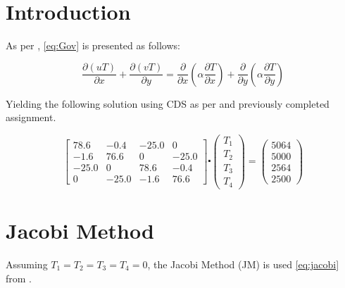 
\chapter{Introduction}
\label{chap:intro}

As per \cite{assign}, \ref{eq:Gov} is presented as follows:

\begin{equation}
	\label{eq:Gov}	
	\frac{\partial(uT)}{\partial x} + \frac{\partial(vT)}{\partial y}= \frac{\partial}{\partial x} \left( \alpha \frac{\partial T}{\partial x} \right) + \frac{\partial}{\partial y} \left( \alpha \frac{\partial T}{\partial y} \right)
\end{equation}

Yielding the following solution using CDS as per \cite{assign} and previously completed assignment.

\begin{equation*}
	\begin{bmatrix}
		78.6	&	-0.4	&	-25.0 	&	0		\\
		-1.6	&	76.6 	&	0  		&	-25.0	\\
		-25.0	&	0   	&	78.6	&	-0.4	\\
		0  		&	-25.0	&	-1.6	&	76.6
	\end{bmatrix}
	\centerdot 
	\begin{pmatrix} T_1	\\	T_2	\\	T_3	\\ T_4	\end{pmatrix}
	=
	\begin{pmatrix} 5064	\\	5000	\\	2564	\\ 2500 \end{pmatrix}	
\end{equation*}

\chapter{Jacobi Method}
\label{chap:jacobi}

Assuming $T_1=T_2=T_3=T_4=0$, the Jacobi Method (JM) is used \ref{eq:jacobi} from \cite{cfdbook}.

